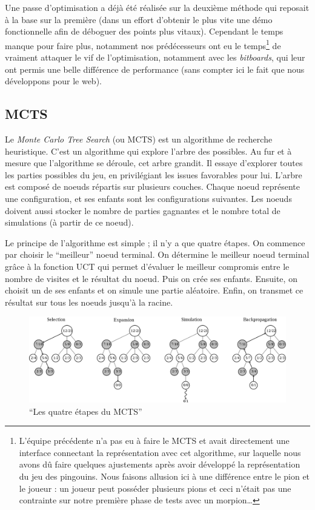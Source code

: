\documentclass[a4paper,11pt]{article}
\begin{document}
Une passe d'optimisation a déjà été réalisée sur la deuxième méthode qui
reposait à la base sur la première (dans un effort d'obtenir le plus
vite une démo fonctionnelle afin de déboguer des points plus vitaux).
Cependant le temps manque pour faire plus, notamment nos prédécesseurs
ont eu le temps\footnote{L'équipe précédente n'a pas eu à faire le MCTS
  et avait directement une interface connectant la représentation avec
  cet algorithme, sur laquelle nous avons dû faire quelques ajustements
  après avoir développé la représentation du jeu des pingouins. Nous
  faisons allusion ici à une différence entre le pion et le joueur : un
  joueur peut posséder plusieurs pions et ceci n'était pas une
  contrainte sur notre première phase de tests avec un morpion\ldots{}}
de vraiment attaquer le vif de l'optimisation, notamment avec les
\emph{bitboards}, qui leur ont permis une belle différence de
performance (sans compter ici le fait que nous développons pour le web).

\hypertarget{mcts}{%
\subsection{MCTS}\label{mcts}}

Le \emph{Monte Carlo Tree Search} (ou MCTS) est un algorithme de
recherche heuristique. C'est un algorithme qui explore l'arbre des
possibles. Au fur et à mesure que l'algorithme se déroule, cet arbre
grandit. Il essaye d'explorer toutes les parties possibles du jeu, en
privilégiant les issues favorables pour lui. L'arbre est composé de
noeuds répartis sur plusieurs couches. Chaque noeud représente une
configuration, et ses enfants sont les configurations suivantes. Les
noeuds doivent aussi stocker le nombre de parties gagnantes et le nombre
total de simulations (à partir de ce noeud).

Le principe de l'algorithme est simple ; il n'y a que quatre étapes. On
commence par choisir le ``meilleur'' noeud terminal. On détermine le
meilleur noeud terminal grâce à la fonction UCT qui permet d'évaluer le
meilleur compromis entre le nombre de visites et le résultat du noeud.
Puis on crée ses enfants. Ensuite, on choisit un de ses enfants et on
simule une partie aléatoire. Enfin, on transmet ce résultat sur tous les
noeuds jusqu'à la racine.

\begin{figure}
\centering
\includegraphics{mcts.png}
\caption{``Les quatre étapes du MCTS''}
\end{figure}
\end{document}

